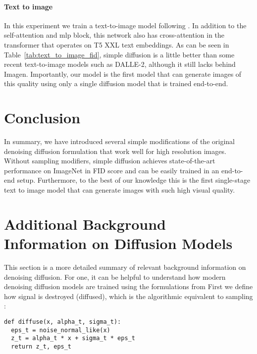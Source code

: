 \documentclass[nohyperref]{article}
\theoremstyle{plain}
\theoremstyle{definition}
\theoremstyle{remark}
\begin{document}
\paragraph{Text to image}
In this experiment we train a text-to-image model following \citep{saharia2022imagen}. In addition to the self-attention and mlp block, this network also has cross-attention in the transformer that operates on T5 XXL text embeddings. As can be seen in Table~\ref{tab:text_to_image_fid}, simple diffusion is a little better than some recent text-to-image models such as DALLE-2, although it still lacks behind Imagen. Importantly, our model is the first model that can generate images of this quality using only a single diffusion model that is trained end-to-end.


 
\section{Conclusion}
In summary, we have introduced several simple modifications of the original denoising diffusion formulation that work well for high resolution images. Without sampling modifiers, simple diffusion achieves state-of-the-art performance on ImageNet in FID score and can be easily trained in an end-to-end setup. Furthermore, to the best of our knowledge this is the first single-stage text to image model that can generate images with such high visual quality. 

\clearpage





\clearpage
\appendix
\onecolumn
\section{Additional Background Information on Diffusion Models}
\label{sec:addition_info_diffusion}
This section is a more detailed summary of relevant background information on denoising diffusion. For one, it can be helpful to understand how modern denoising diffusion models \citep{ho2020denoising} are trained using the formulations from \citep{kingma2021vdm}
First we define how signal is destroyed (diffused), which is the algorithmic equivalent to sampling :
\begin{lstlisting}[style=python]
def diffuse(x, alpha_t, sigma_t):
  eps_t = noise_normal_like(x)
  z_t = alpha_t * x + sigma_t * eps_t
  return z_t, eps_t
\end{lstlisting}
\end{document}
